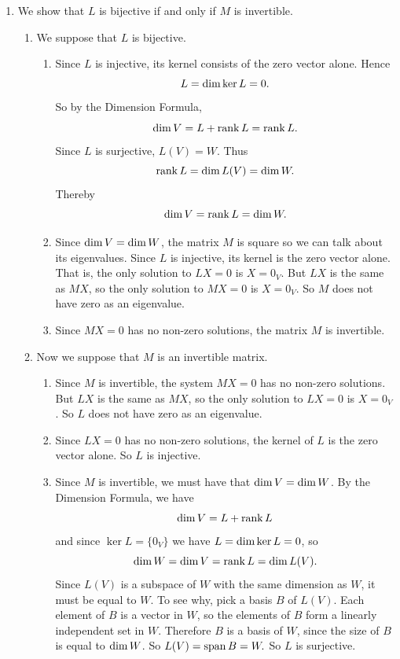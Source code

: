 \begin{enumerate}
\item  We  show  that  \(L\)  is  bijective  if  and  only  if  \(M\)  is  invertible.
 		\begin{enumerate}
 		\item  We  suppose  that  \(L\)  is  bijective.
 		\begin{enumerate}
 		\item  Since  \(L\)  is  injective,  its  kernel  consists  of  the  zero  vector  alone.  Hence
 		\[
 		\null  L=\dimension  \ker  L=0.
 		\]
 		So  by  the  Dimension  Formula,
 		\[
 		\dimension  V=\null  L+\rank  L=\rank  L.
 		\]
 		Since  \(L\)  is  surjective,  \(L(V)=W.\)  Thus
 		\[
 		\operatorname{rank}  L=\operatorname{dim}  L(V)=\operatorname{dim}  W.
 		\]
 		Thereby  \[\operatorname{dim}  V=\operatorname{rank}  L=\operatorname{dim}  W.\]
 		\item  Since  \(\operatorname{dim}  V=\operatorname{dim}  W\),  the  matrix  \(M\)  is  square  so  we  can  talk  about  its  eigenvalues.  Since  \(L\)  is  injective,  its  kernel  is  the  zero  vector  alone.  That  is,  the  only  solution  to  \(LX=0\)  is  \(X=0_V\).  But  \(LX\)  is  the  same  as  \(MX\),  so  the  only  solution  to  \(MX=0\)  is  \(X=0_V\).  So  \(M\)  does  not  have  zero  as  an  eigenvalue.
 		\item  Since  \(MX=0\)  has  no  non-zero  solutions,  the  matrix  \(M\)  is  invertible.
	\end{enumerate}
 		\item  Now  we  suppose  that  \(M\)  is  an  invertible  matrix.
 		\begin{enumerate}
 		\item  Since  \(M\)  is  invertible,  the  system  \(MX=0\)  has  no  non-zero  solutions.  But  \(LX\)  is  the  same  as  \(MX\),  so  the  only  solution  to  \(LX=0\)  is  \(X=0_V\).  So  \(L\)  does  not  have  zero  as  an  eigenvalue.
 		\item  Since  \(LX=0\)  has  no  non-zero  solutions,  the  kernel  of  \(L\)  is  the  zero  vector  alone.  So  \(L\)  is  injective.
 		\item  Since  \(M\)  is  invertible,  we  must  have  that  \(\operatorname{dim}  V=\operatorname{dim}  W\).  By  the  Dimension  Formula,  we  have
 		\[
 		\dimension  V=\null  L+\rank  L
 		\]
 		and  since  \(\ker  L=\{0_V\}\)  we  have  \(\null  L=\dimension  \ker  L=0\),  so
 		\[
 		\operatorname{dim}  W=\operatorname{dim}  V=\operatorname{rank}  L=\operatorname{dim}  L(V).
 		\]
 		Since  \(L(V)\)  is  a  subspace  of  \(W\)  with  the  same  dimension  as  \(W\),  it  must  be  equal  to  \(W\).  To  see  why,  pick  a  basis  \(B\)  of  \(L(V)\).  Each  element  of  \(B\)  is  a  vector  in  \(W\),  so  the  elements  of  \(B\)  form  a  linearly  independent  set  in  \(W\).  Therefore  \(B\)  is  a  basis  of  \(W\),  since  the  size  of  \(B\)  is  equal  to  \(\operatorname{dim}  W\).  So  \(L(V)=\operatorname{span}  B=W.\)  So  \(L\)  is  surjective.
 		\end{enumerate}
 		\end{enumerate}


\end{enumerate}
